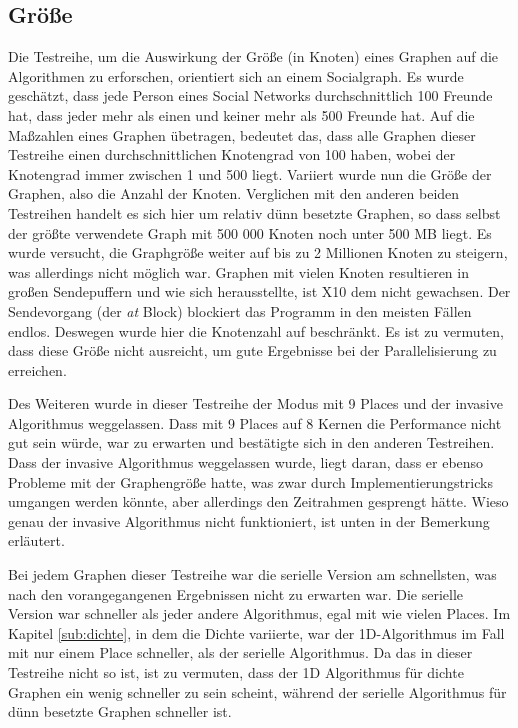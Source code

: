 \subsection{Größe} %
\label{sub:gr_e}
Die Testreihe, um die Auswirkung der Größe (in Knoten) eines Graphen auf die Algorithmen zu erforschen, orientiert sich an einem Socialgraph. Es wurde geschätzt, dass jede Person eines Social Networks durchschnittlich 100 Freunde hat, dass jeder mehr als einen und keiner mehr als 500 Freunde hat. Auf die Maßzahlen eines Graphen übetragen, bedeutet das, dass alle Graphen dieser Testreihe einen durchschnittlichen Knotengrad von 100 haben, wobei der Knotengrad immer zwischen 1 und 500 liegt. Variiert wurde nun die Größe der Graphen, also die Anzahl der Knoten. Verglichen mit den anderen beiden Testreihen handelt es sich hier um relativ dünn besetzte Graphen, so dass selbst der größte verwendete Graph mit 500 000 Knoten noch unter 500 MB liegt. Es wurde versucht, die Graphgröße weiter auf bis zu 2 Millionen Knoten zu steigern, was allerdings nicht möglich war. Graphen mit vielen Knoten resultieren in großen Sendepuffern und wie sich herausstellte, ist X10 dem nicht gewachsen. Der Sendevorgang (der \textit{at} Block) blockiert das Programm in den meisten Fällen endlos. Deswegen wurde hier die Knotenzahl auf  beschränkt. Es ist zu vermuten, dass diese Größe nicht ausreicht, um gute Ergebnisse bei der Parallelisierung zu erreichen.

Des Weiteren wurde in dieser Testreihe der Modus mit 9 Places und der invasive Algorithmus weggelassen. Dass mit 9 Places auf 8 Kernen die Performance nicht gut sein würde, war zu erwarten und bestätigte sich in den anderen Testreihen. Dass der invasive Algorithmus weggelassen wurde, liegt daran, dass er ebenso Probleme mit der Graphengröße hatte, was zwar durch Implementierungstricks umgangen werden könnte, aber allerdings den Zeitrahmen gesprengt hätte. Wieso genau der invasive Algorithmus nicht funktioniert, ist unten in der Bemerkung erläutert.

Bei jedem Graphen dieser Testreihe war die serielle Version am schnellsten, was nach den vorangegangenen Ergebnissen nicht zu erwarten war. Die serielle Version war schneller als jeder andere Algorithmus, egal mit wie vielen Places. Im Kapitel \ref{sub:dichte}, in dem die Dichte variierte, war der 1D-Algorithmus im Fall mit nur einem Place schneller, als der serielle Algorithmus. Da das in dieser Testreihe nicht so ist, ist zu vermuten, dass der 1D Algorithmus für dichte Graphen ein wenig schneller zu sein scheint, während der serielle Algorithmus für dünn besetzte Graphen schneller ist.

